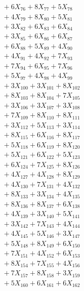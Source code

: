 \documentclass[a4paper,10pt]{article}
\begin{document}
{\begin{align}
&\;  + 6 X_{76} + 8 X_{77} + 5 X_{78} \\[0.3ex]
&\;  + 4 X_{79} + 8 X_{80} + 5 X_{81} \\[0.3ex]
&\;  + 3 X_{82} + 6 X_{83} + 6 X_{84} \\[0.3ex]
&\;  + 3 X_{85} + 6 X_{86} + 6 X_{87} \\[0.3ex]
&\;  + 6 X_{88} + 5 X_{89} + 4 X_{90} \\[0.3ex]
&\;  + 4 X_{91} + 4 X_{92} + 7 X_{93} \\[0.3ex]
&\;  + 7 X_{94} + 6 X_{95} + 7 X_{96} \\[0.3ex]
&\;  + 5 X_{97} + 4 X_{98} + 4 X_{99} \\[0.5ex]\allowbreak
&\;  + 3 X_{100} + 3 X_{101} + 8 X_{102} \\[0.3ex]
&\;  + 8 X_{103} + 8 X_{104} + 7 X_{105} \\[0.3ex]
&\;  + 3 X_{106} + 3 X_{107} + 3 X_{108} \\[0.3ex]
&\;  + 7 X_{109} + 8 X_{110} + 8 X_{111} \\[0.3ex]
&\;  + 3 X_{112} + 5 X_{113} + 3 X_{114} \\[0.3ex]
&\;  + 8 X_{115} + 6 X_{116} + 8 X_{117} \\[0.3ex]
&\;  + 5 X_{118} + 6 X_{119} + 8 X_{120} \\[0.3ex]
&\;  + 5 X_{121} + 6 X_{122} + 5 X_{123} \\[0.3ex]
&\;  + 6 X_{124} + 7 X_{125} + 8 X_{126} \\[0.3ex]
&\;  + 4 X_{127} + 4 X_{128} + 8 X_{129} \\[0.5ex]\allowbreak
&\;  + 4 X_{130} + 7 X_{131} + 4 X_{132} \\[0.3ex]
&\;  + 8 X_{133} + 3 X_{134} + 4 X_{135} \\[0.3ex]
&\;  + 8 X_{136} + 8 X_{137} + 6 X_{138} \\[0.3ex]
&\;  + 4 X_{139} + 3 X_{140} + 5 X_{141} \\[0.3ex]
&\;  + 3 X_{142} + 7 X_{143} + 4 X_{144} \\[0.3ex]
&\;  + 4 X_{145} + 5 X_{146} + 3 X_{147} \\[0.3ex]
&\;  + 5 X_{148} + 8 X_{149} + 6 X_{150} \\[0.3ex]
&\;  + 7 X_{151} + 4 X_{152} + 6 X_{153} \\[0.3ex]
&\;  + 8 X_{154} + 7 X_{155} + 4 X_{156} \\[0.3ex]
&\;  + 7 X_{157} + 8 X_{158} + 3 X_{159} \\[0.5ex]\allowbreak
&\;  + 5 X_{160} + 6 X_{161} + 6 X_{162} \\[0.3ex]

\end{align}}
\end{document}
